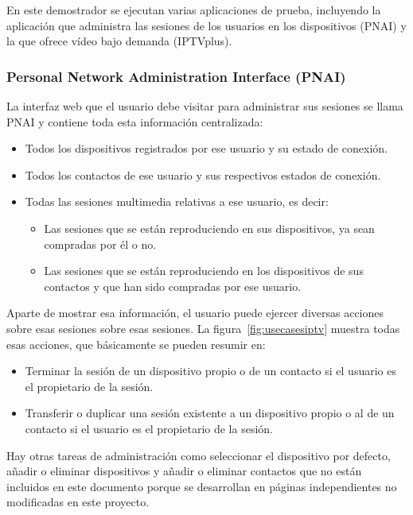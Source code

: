 En este demostrador se ejecutan varias aplicaciones de prueba, incluyendo la aplicación que administra las sesiones de los usuarios en los dispositivos (PNAI) y la que ofrece vídeo bajo demanda (IPTVplus).

\subsubsection{Personal Network Administration Interface (PNAI)} %
\label{ssub:personal_network_administration_interface_pnai}

La interfaz web que el usuario debe visitar para administrar sus sesiones se llama PNAI y contiene toda esta información centralizada:

\begin{itemize}
  \item Todos los dispositivos registrados por ese usuario y su estado de conexión.
  \item Todos los contactos de ese usuario y sus respectivos estados de conexión.
  \item Todas las sesiones multimedia relativas a ese usuario, es decir:
  \begin{itemize}
    \item Las sesiones que se están reproduciendo en sus dispositivos, ya sean compradas por él o no.
    \item Las sesiones que se están reproduciendo en los dispositivos de sus contactos y que han sido compradas por ese usuario.
  \end{itemize}
\end{itemize}

Aparte de mostrar esa información, el usuario puede ejercer diversas acciones sobre esas sesiones sobre esas sesiones.
La figura~\ref{fig:usecasesiptv} muestra todas esas acciones, que básicamente se pueden resumir en:

\begin{itemize}
  \item Terminar la sesión de un dispositivo propio o de un contacto si el usuario es el propietario de la sesión.
  \item Transferir o duplicar una sesión existente a un dispositivo propio o al de un contacto si el usuario es el propietario de la sesión.
\end{itemize}

Hay otras tareas de administración como seleccionar el dispositivo por defecto, añadir o eliminar dispositivos y añadir o eliminar contactos que no están incluidos en este documento porque se desarrollan en páginas independientes no modificadas en este proyecto.

